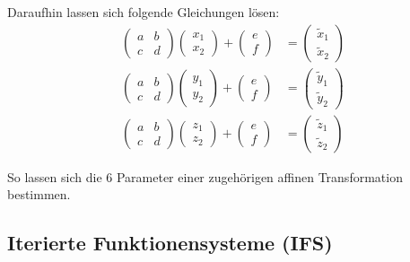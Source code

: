 \documentclass[afourpaper]{tufte-handout}
\begin{document}
Daraufhin lassen sich folgende Gleichungen lösen:
\begin{align*}
  \begin{pmatrix}
    a & b \\ c & d
  \end{pmatrix} \begin{pmatrix}
    x_1 \\ x_2
  \end{pmatrix} + \begin{pmatrix}
    e \\ f
  \end{pmatrix} &= \begin{pmatrix}
    \widetilde{x}_1 \\ \widetilde{x}_2
  \end{pmatrix} \\
  \begin{pmatrix}
    a & b \\ c & d
  \end{pmatrix} \begin{pmatrix}
    y_1 \\ y_2
  \end{pmatrix} + \begin{pmatrix}
    e \\ f
  \end{pmatrix} &= \begin{pmatrix}
    \widetilde{y}_1 \\ \widetilde{y}_2
  \end{pmatrix} \\
  \begin{pmatrix}
    a & b \\ c & d
  \end{pmatrix} \begin{pmatrix}
    z_1 \\ z_2
  \end{pmatrix} + \begin{pmatrix}
    e \\ f
  \end{pmatrix} &= \begin{pmatrix}
    \widetilde{z}_1 \\ \widetilde{z}_2
  \end{pmatrix}
\end{align*}

So lassen sich die 6 Parameter einer zugehörigen affinen Transformation bestimmen.

\subsection{Iterierte Funktionensysteme (IFS)}
\end{document}
